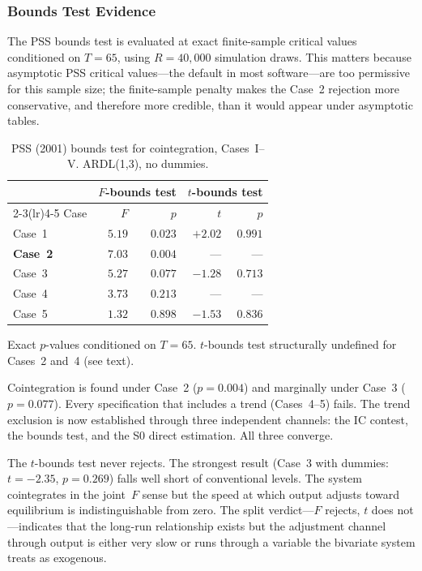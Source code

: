\documentclass[11pt,a4paper]{article}
\begin{document}
\subsubsection{Bounds Test Evidence}

The PSS bounds test is evaluated at exact finite-sample critical values conditioned on $T = 65$, using $R = 40{,}000$ simulation draws. This matters because asymptotic PSS critical values---the default in most software---are too permissive for this sample size; the finite-sample penalty makes the Case~2 rejection more conservative, and therefore more credible, than it would appear under asymptotic tables.


\begin{table}[!ht]
	\centering
	\small
	\caption{PSS (2001) bounds test for cointegration, Cases~I--V. ARDL(1,3), no dummies.}
	\label{tab:S1_bounds_nodummy}
	\begin{tabular}{lrrrr}
		\toprule
		& \multicolumn{2}{c}{$F$-bounds test} & \multicolumn{2}{c}{$t$-bounds test} \\
		\cmidrule(lr){2-3}\cmidrule(lr){4-5}
		Case & $F$ & $p$ & $t$ & $p$ \\
		\midrule
		Case~1 & $5.19$ & $0.023$ & $+2.02$ & $0.991$ \\
		\textbf{Case~2} & $\bm{7.03}$ & $\bm{0.004}$ & --- & --- \\
		Case~3 & $5.27$ & $0.077$ & $-1.28$ & $0.713$ \\
		Case~4 & $3.73$ & $0.213$ & --- & --- \\
		Case~5 & $1.32$ & $0.898$ & $-1.53$ & $0.836$ \\
		\bottomrule
	\end{tabular}
	\par\vspace{0.3em}
	\footnotesize Exact $p$-values conditioned on $T = 65$. $t$-bounds test structurally undefined for Cases~2 and~4 (see text).
\end{table}


Cointegration is found under Case~2 ($p = 0.004$) and marginally under Case~3 ($p = 0.077$). Every specification that includes a trend (Cases~4--5) fails. The trend exclusion is now established through three independent channels: the IC contest, the bounds test, and the S0 direct estimation. All three converge.

The $t$-bounds test never rejects. The strongest result (Case~3 with dummies: $t = -2.35$, $p = 0.269$) falls well short of conventional levels. The system cointegrates in the joint~$F$ sense but the speed at which output adjusts toward equilibrium is indistinguishable from zero. The split verdict---$F$ rejects, $t$ does not---indicates that the long-run relationship exists but the adjustment channel through output is either very slow or runs through a variable the bivariate system treats as exogenous.
\end{document}
